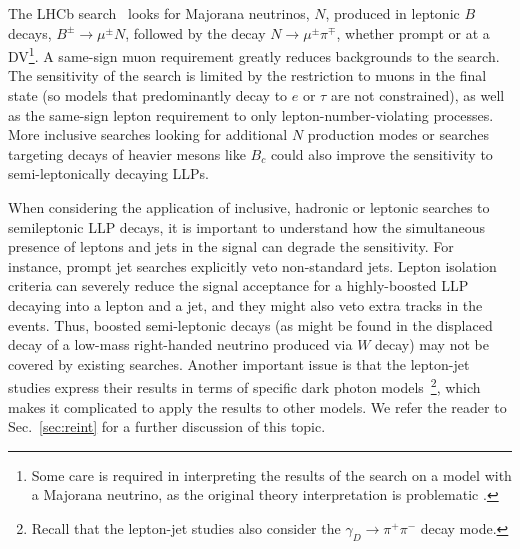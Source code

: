 The LHCb search~\cite{Aaij:2014aba} looks for Majorana neutrinos, $N$, produced in leptonic $B$ decays, $B^\pm\rightarrow \mu^\pm N$, followed by the  decay $N\rightarrow \mu^\pm\pi^\mp$, whether prompt or at a DV\footnote{Some care is required in interpreting the results of the search on a model with a Majorana neutrino, as the original theory interpretation is problematic \cite{Shuve:2016muy}.}. A same-sign muon requirement greatly reduces backgrounds to the search. The sensitivity of the search is limited by the restriction to muons in the final state (so models that predominantly decay to $e$ or $\tau$ are not constrained), as well as the same-sign lepton requirement to only lepton-number-violating processes. More inclusive searches looking for additional $N$ production modes \cite{Gorbunov:2007ak} or searches targeting decays of heavier mesons like $B_c$ \cite{Milanes:2016rzr} could also improve the sensitivity to semi-leptonically decaying LLPs. 

When considering the application of inclusive, hadronic or leptonic searches to semileptonic LLP decays, it is important to understand how the simultaneous presence of leptons and jets in the signal can degrade the sensitivity. For instance, prompt jet searches explicitly veto non-standard jets. Lepton isolation criteria can severely reduce the signal acceptance for a highly-boosted LLP decaying into a lepton and a jet, and they might also veto extra tracks in the events. Thus,  boosted semi-leptonic decays (as might be found in the displaced decay of a low-mass right-handed neutrino produced via $W$ decay) may not be covered by existing searches. 
Another important issue is that the lepton-jet studies express their results in terms of specific dark photon models~\footnote{Recall that the lepton-jet studies also consider the $\gamma_D \to \pi^+ \pi^-$ decay mode.}, which makes it complicated to apply the results to other models. We refer the reader to Sec.~\ref{sec:reint} for a further discussion of this topic.

